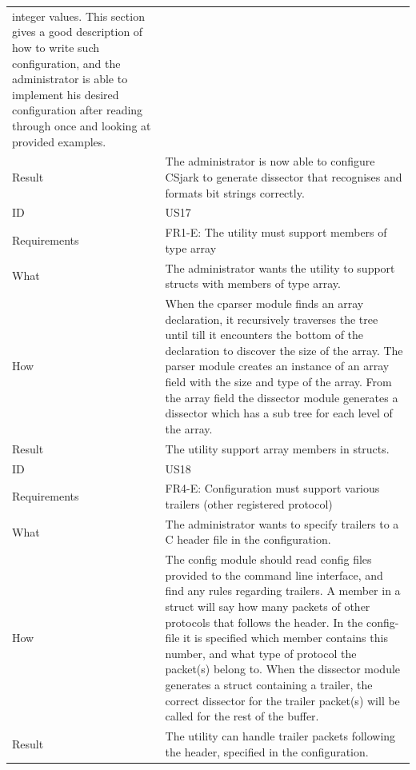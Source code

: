 \begin{table}[htbp]
{\begin{tabularx}{1.2\textwidth}{l X}
	 integer values. This section gives a good description of how to write such configuration, and the administrator is able to implement his desired configuration
	after reading through once and looking at provided examples.  \\
	Result & The administrator is now able to configure CSjark to generate dissector that recognises and formats bit strings correctly. \\
	\midrule
	ID & US17 \\
	Requirements & FR1-E: The utility must support members of type array \\
	What & The administrator wants the utility to support structs with members of type array. \\
	How & When the cparser module finds an array declaration, it recursively traverses the tree until till it encounters the bottom of the declaration 
	to discover the size of the array. The parser module creates an instance of an array field with the size and type of the array. From the array field
	the dissector module generates a dissector which has a sub tree for each level of the array. \\
	Result & The utility support array members in structs. \\
	\midrule
	ID & US18 \\
	Requirements & FR4-E: Configuration must support various trailers (other registered protocol) \\
	What & The administrator wants to specify trailers to a C header file in the configuration. \\
	How & The config module should read config files provided to the command line interface, and find any rules regarding trailers. A member in a struct
	will say how many packets of other protocols that follows the header. In the config-file it is specified which member contains this number, and what
 	type of protocol the packet(s) belong to. When the dissector module generates a struct containing a trailer, the correct dissector for the trailer packet(s) 
	will be called for the rest of the buffer. \\
	Result & The utility can handle trailer packets following the header, specified in the configuration. \\
	\bottomrule
\end{tabularx}}
\end{table}

